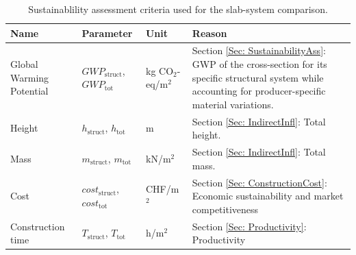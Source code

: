 \vspace{-0.3cm}
\begin{table}[h]
    \centering
    \begingroup
    \scriptsize
    \caption{Sustainablility assessment criteria used for the slab-system comparison. \label{Tab: SustFact}}
    \setlength{\tabcolsep}{4pt}
    \renewcommand{\arraystretch}{1.2}
    \begin{tabularx}{\textwidth}{@{}L{2.6cm}|L{3.5cm}|L{1.6cm}|X@{}}
    \hline
    \textbf{Name} &
    \textbf{Parameter} &
    \textbf{Unit} &
    \textbf{Reason} \\ \hline

    Global Warming Potential &
    $GWP_{\mathrm{struct}}$, $GWP_{\mathrm{tot}}$ &
    kg CO$_2$-eq/m$^2$ &
    Section \ref{Sec: SustainabilityAss}: GWP of the cross-section for its specific structural system while accounting for producer-specific material variations.  \\

    Height &
    $h_{\mathrm{struct}}$, $h_{\mathrm{tot}}$ &
    m &
    Section \ref{Sec: IndirectInfl}: Total height.  \\

    Mass &
    $m_{\mathrm{struct}}$, $m_{\mathrm{tot}}$ &
    kN/m$^2$ &
    Section \ref{Sec: IndirectInfl}: Total mass.  \\

    Cost &
    $cost_{\mathrm{struct}}$, $cost_{\mathrm{tot}}$ &
    CHF/m$^2$ &
    Section \ref{Sec: ConstructionCost}: Economic sustainability and market competitiveness\\

    Construction time &
    $T_{\mathrm{struct}}$, $T_{\mathrm{tot}}$ &
    h/m$^2$ &
    Section \ref{Sec: Productivity}: Productivity  \\ \hline
    \end{tabularx}
    \endgroup
\end{table}

